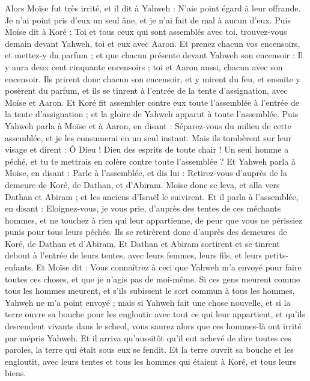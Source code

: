 \begin{multicols}{2}
Alors Moïse fut très irrité, et il dit à Yahweh : N'aie point égard à leur offrande. Je n'ai point pris d'eux un seul âne, et je n'ai fait de mal à aucun d'eux.
Puis Moïse dit à Koré : Toi et tous ceux qui sont assemblés avec toi, trouvez-vous demain devant Yahweh, toi et eux avec Aaron.
Et prenez chacun vos encensoirs, et mettez-y du parfum ; et que chacun présente devant Yahweh son encensoir : Il y aura deux cent cinquante encensoirs ; toi et Aaron aussi, chacun avec son encensoir.
Ils prirent donc chacun son encensoir, et y mirent du feu, et ensuite y posèrent du parfum, et ils se tinrent à l'entrée de la tente d'assignation, avec Moïse et Aaron.
Et Koré fit assembler contre eux toute l'assemblée à l'entrée de la tente d'assignation ; et la gloire de Yahweh apparut à toute l'assemblée.
Puis Yahweh parla à Moïse et à Aaron, en disant :
Séparez-vous du milieu de cette assemblée, et je les consumerai en un seul instant.
Mais ils tombèrent sur leur visage et dirent : Ô Dieu ! Dieu des esprits de toute chair ! Un seul homme a péché, et tu te mettrais en colère contre toute l'assemblée ?
Et Yahweh parla à Moïse, en disant :
Parle à l'assemblée, et dis lui : Retirez-vous d'auprès de la demeure de Koré, de Dathan, et d'Abiram.
Moïse donc se leva, et alla vers Dathan et Abiram ; et les anciens d'Israël le suivirent.
Et il parla à l'assemblée, en disant : Eloignez-vous, je vous prie, d'auprès des tentes de ces méchants hommes, et ne touchez à rien qui leur appartienne, de peur que vous ne périssiez punis pour tous leurs péchés.
Ils se retirèrent donc d'auprès des demeures de Koré, de Dathan et d'Abiram. Et Dathan et Abiram sortirent et se tinrent debout à l'entrée de leurs tentes, avec leurs femmes, leurs fils, et leurs petits-enfants.
Et Moïse dit : Vous connaîtrez à ceci que Yahweh m'a envoyé pour faire toutes ces choses, et que je n'agis pas de moi-même.
Si ces gens meurent comme tous les hommes meurent, et s'ils subissent le sort commun à tous les hommes, Yahweh ne m'a point envoyé ;
mais si Yahweh fait une chose nouvelle, et si la terre ouvre sa bouche pour les engloutir avec tout ce qui leur appartient, et qu'ils descendent vivants dans le scheol, vous saurez alors que ces hommes-là ont irrité par mépris Yahweh.
Et il arriva qu'aussitôt qu'il eut achevé de dire toutes ces paroles, la terre qui était sous eux se fendit.
Et la terre ouvrit sa bouche et les engloutit, avec leurs tentes et tous les hommes qui étaient à Koré, et tous leurs biens.

\end{multicols}
